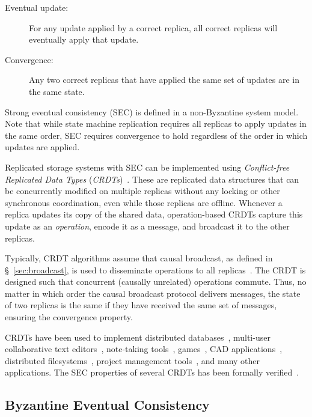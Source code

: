 \documentclass[a4paper,anonymous,USenglish]{lipics-v2019}
\begin{document}
\begin{description}
\item[Eventual update:] For any update applied by a correct replica, all correct replicas will eventually apply that update.
\item[Convergence:] Any two correct replicas that have applied the same set of updates are in the same state.
\end{description}

Strong eventual consistency (SEC) is defined in a non-Byzantine system model.
Note that while state machine replication requires all replicas to apply updates in the same order, SEC requires convergence to hold regardless of the order in which updates are applied.

Replicated storage systems with SEC can be implemented using \emph{Conflict-free Replicated Data Types} (\emph{CRDTs})~\cite{Preguica:2018gi,Shapiro:2011}.
These are replicated data structures that can be concurrently modified on multiple replicas without any locking or other synchronous coordination, even while those replicas are offline.
Whenever a replica updates its copy of the shared data, operation-based CRDTs capture this update as an \emph{operation}, encode it as a message, and broadcast it to the other replicas.

Typically, CRDT algorithms assume that causal broadcast, as defined in \S~\ref{sec:broadcast}, is used to disseminate operations to all replicas~\cite{Gomes:2017gy,Shapiro:2011}.
The CRDT is designed such that concurrent (causally unrelated) operations commute.
Thus, no matter in which order the causal broadcast protocol delivers messages, the state of two replicas is the same if they have received the same set of messages, ensuring the convergence property.

CRDTs have been used to implement distributed databases~\cite{Akkoorath2016Cure,Brown2016bigsets,Zawirski2015SwiftCloud}, multi-user collaborative text editors~\cite{AhmedNacer:2011ke,Nedelec:2016eo,Weiss:2009ht}, note-taking tools~\cite{vanHardenberg2020PushPin}, games~\cite{vanderLinde:2017fu}, CAD applications~\cite{Lv:2018ie}, distributed filesystems~\cite{Najafzadeh:2018bw,Tao:2015gd}, project management tools~\cite{Kleppmann2019localfirst}, and many other applications.
The SEC properties of several CRDTs has been formally verified~\cite{Gomes:2017gy,Zeller:2014fl}.

\subsection{Byzantine Eventual Consistency}
\end{document}
